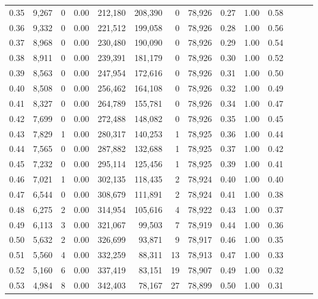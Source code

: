 \begin{tabular}{rrrrrrrrrrrrrr}
0.35 &  9,267 &      0 &  0.00 &  212,180 &  208,390 &       0 &  78,926 &  0.27 &  1.00 &      0.58 \\
0.36 &  9,332 &      0 &  0.00 &  221,512 &  199,058 &       0 &  78,926 &  0.28 &  1.00 &      0.56 \\
0.37 &  8,968 &      0 &  0.00 &  230,480 &  190,090 &       0 &  78,926 &  0.29 &  1.00 &      0.54 \\
0.38 &  8,911 &      0 &  0.00 &  239,391 &  181,179 &       0 &  78,926 &  0.30 &  1.00 &      0.52 \\
0.39 &  8,563 &      0 &  0.00 &  247,954 &  172,616 &       0 &  78,926 &  0.31 &  1.00 &      0.50 \\
0.40 &  8,508 &      0 &  0.00 &  256,462 &  164,108 &       0 &  78,926 &  0.32 &  1.00 &      0.49 \\
0.41 &  8,327 &      0 &  0.00 &  264,789 &  155,781 &       0 &  78,926 &  0.34 &  1.00 &      0.47 \\
0.42 &  7,699 &      0 &  0.00 &  272,488 &  148,082 &       0 &  78,926 &  0.35 &  1.00 &      0.45 \\
0.43 &  7,829 &      1 &  0.00 &  280,317 &  140,253 &       1 &  78,925 &  0.36 &  1.00 &      0.44 \\
0.44 &  7,565 &      0 &  0.00 &  287,882 &  132,688 &       1 &  78,925 &  0.37 &  1.00 &      0.42 \\
0.45 &  7,232 &      0 &  0.00 &  295,114 &  125,456 &       1 &  78,925 &  0.39 &  1.00 &      0.41 \\
0.46 &  7,021 &      1 &  0.00 &  302,135 &  118,435 &       2 &  78,924 &  0.40 &  1.00 &      0.40 \\
0.47 &  6,544 &      0 &  0.00 &  308,679 &  111,891 &       2 &  78,924 &  0.41 &  1.00 &      0.38 \\
0.48 &  6,275 &      2 &  0.00 &  314,954 &  105,616 &       4 &  78,922 &  0.43 &  1.00 &      0.37 \\
0.49 &  6,113 &      3 &  0.00 &  321,067 &   99,503 &       7 &  78,919 &  0.44 &  1.00 &      0.36 \\
0.50 &  5,632 &      2 &  0.00 &  326,699 &   93,871 &       9 &  78,917 &  0.46 &  1.00 &      0.35 \\
0.51 &  5,560 &      4 &  0.00 &  332,259 &   88,311 &      13 &  78,913 &  0.47 &  1.00 &      0.33 \\
0.52 &  5,160 &      6 &  0.00 &  337,419 &   83,151 &      19 &  78,907 &  0.49 &  1.00 &      0.32 \\
0.53 &  4,984 &      8 &  0.00 &  342,403 &   78,167 &      27 &  78,899 &  0.50 &  1.00 &      0.31 \\

\end{tabular}
